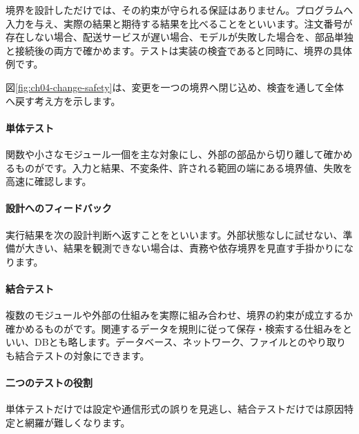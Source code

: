 境界を設計しただけでは、その約束が守られる保証はありません。プログラムへ入力を与え、実際の結果と期待する結果を比べることをといいます。注文番号が存在しない場合、配送サービスが遅い場合、モデルが失敗した場合を、部品単独と接続後の両方で確かめます。テストは実装の検査であると同時に、境界の具体例です。

図\ref{fig:ch04-change-safety}は、変更を一つの境界へ閉じ込め、検査を通して全体へ戻す考え方を示します。

\begingroup
\begingroup
\paragraph{単体テスト}
        関数や小さなモジュール一個を主な対象にし、外部の部品から切り離して確かめるものがです。入力と結果、不変条件、許される範囲の端にある境界値、失敗を高速に確認します。

\paragraph{設計へのフィードバック}
        実行結果を次の設計判断へ返すことをといいます。外部状態なしに試せない、準備が大きい、結果を観測できない場合は、責務や依存境界を見直す手掛かりになります。

\par
\endgroup
\medskip
\begingroup
\paragraph{結合テスト}
        複数のモジュールや外部の仕組みを実際に組み合わせ、境界の約束が成立するか確かめるものがです。関連するデータを規則に従って保存・検索する仕組みをといい、DBとも略します。データベース、ネットワーク、ファイルとのやり取りも結合テストの対象にできます。

\paragraph{二つのテストの役割}
        単体テストだけでは設定や通信形式の誤りを見逃し、結合テストだけでは原因特定と網羅が難しくなります。

\par
\endgroup
\par
\endgroup


